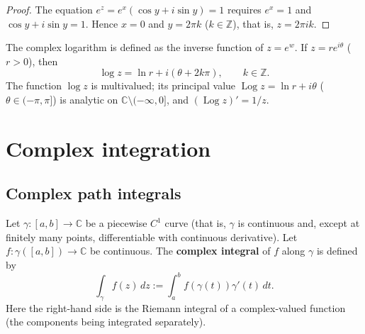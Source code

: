 \begin{proof}
The equation $e^z = e^x(\cos y + i \sin y) = 1$ requires $e^x = 1$ and $\cos y + i \sin y = 1$. Hence $x = 0$ and $y = 2\pi k$ ($k \in \mathbb{Z}$), that is, $z = 2\pi i k$.
\end{proof}

\begin{example}\label{ex:ca_log_multivalued}
The complex logarithm is defined as the inverse function of $z = e^w$. If $z = re^{i\theta}$ ($r > 0$), then
\[
\log z = \ln r + i(\theta + 2k\pi), \qquad k \in \mathbb{Z}.
\]
The function $\log z$ is multivalued; its principal value $\operatorname{Log} z = \ln r + i\theta$ ($\theta \in (-\pi, \pi]$) is analytic on $\mathbb{C} \setminus (-\infty, 0]$, and $(\operatorname{Log} z)' = 1/z$.
\end{example}

\section{Complex integration}

\subsection{Complex path integrals}

\begin{definition}\label{def:ca_contour_integral}
Let $\gamma: [a, b] \to \mathbb{C}$ be a piecewise $C^1$ curve (that is, $\gamma$ is continuous and, except at finitely many points, differentiable with continuous derivative). Let $f: \gamma([a, b]) \to \mathbb{C}$ be continuous. The \textbf{complex integral} of $f$ along $\gamma$ is defined by
\[
\int_\gamma f(z) \, dz := \int_a^b f(\gamma(t)) \gamma'(t) \, dt.
\]
Here the right-hand side is the Riemann integral of a complex-valued function (the components being integrated separately).
\end{definition}

